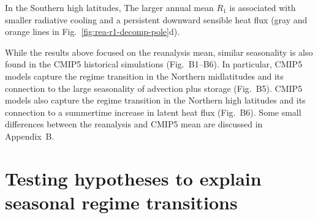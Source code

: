 \documentclass{ametsocV5}
\begin{document}
    In the Southern high latitudes,   The larger annual mean $R_1$ is associated with smaller radiative cooling and a persistent downward sensible heat flux (gray and orange lines in Fig.~\ref{fig:rea-r1-decomp-pole}d).
    
    While the results above focused on the reanalysis mean, similar seasonality is also found in the CMIP5 historical simulations (Fig.~B1--B6). In particular, CMIP5 models capture the regime transition in the Northern midlatitudes and its connection to the large seasonality of advection plus storage (Fig.~B5). CMIP5 models also capture the regime transition in the Northern high latitudes and its connection to a summertime increase in latent heat flux (Fig.~B6). Some small differences between the reanalysis and CMIP5 mean are discussed in Appendix~B.

\section{Testing hypotheses to explain seasonal regime transitions} \label{sec:hypo}
\end{document}
